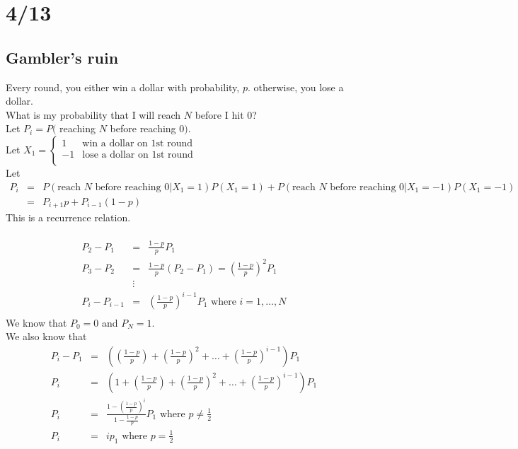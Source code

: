 \section*{4/13}
  \subsection*{Gambler's ruin}
    Every round, you either win a dollar with probability, $p$. otherwise,
    you lose a dollar.\\
    What is my probability that I will reach $N$ before I hit 0?\\
    Let $P_i = P($ reaching $N$ before reaching 0$)$.\\
    Let $X_1 = \begin{cases} 
      1 & \text{win a dollar on 1st round}\\
      -1 & \text{lose a dollar on 1st round}\\
    \end{cases}$\\
    Let 
    \begin{eqnarray*}
      P_i & = & P(\text{reach $N$ before reaching 0} | X_1 = 1)P(X_1 = 1) + 
        P(\text{reach $N$ before reaching 0} | X_1 = -1)P(X_1 = -1)\\
        & = & P_{i+1}p + P_{i-1}(1-p)
    \end{eqnarray*}
    This is a recurrence relation.\\\\
    \begin{eqnarray*}
      P_2 - P_1 & = & \frac{1 - p}{p} P_1\\
      P_3 - P_2 & = & \frac{1 - p}{p} (P_2 - P_1) = \left(\frac{1 - p}{p}\right)^2  P_1\\
      & \vdots &\\
      P_i - P_{i-1} & = & \left(\frac{1 - p}{p}\right)^{i-1} P_1 \text{ where }
      i = 1, \ldots, N\\
    \end{eqnarray*}
    We know that $P_0 = 0$ and $P_N = 1$.\\
    We also know that
    \begin{eqnarray*}
      P_i - P_1 & = & \left( \left(\frac{1-p}{p}\right) + \left(\frac{1-p}{p}\right)^2 + \ldots + \left(\frac{1-p}{p}\right)^{i-1}\right)P_1\\
      P_i & = & \left( 1+ \left(\frac{1-p}{p}\right) + \left(\frac{1-p}{p}\right)^2 + \ldots + \left(\frac{1-p}{p}\right)^{i-1}\right)P_1\\
      P_i & = & \frac{1 - \left(\frac{1-p}{p}\right)^i}{1 - \frac{1-p}{p}}P_1 \text{ where } p \not= \frac{1}{2}\\
      P_i & = & ip_1 \text{ where } p = \frac{1}{2}\\
    \end{eqnarray*}
